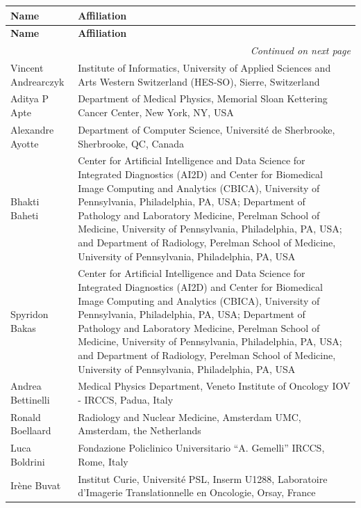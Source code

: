 \documentclass[fleqn,a4paper,oneside,openany]{book}
\begin{document}
\small
\begin{longtable}{p{4cm}p{10cm}}

\toprule
\textbf{Name} & \textbf{Affiliation} \\
\midrule
\endfirsthead

\toprule
\textbf{Name} & \textbf{Affiliation} \\
\midrule
\endhead

\bottomrule
\multicolumn{2}{r}{\textit{Continued on next page}}
\endfoot

\\
\endlastfoot
Vincent Andrearczyk & Institute of Informatics, University of Applied Sciences and Arts Western Switzerland (HES-SO), Sierre, Switzerland\\
Aditya P Apte & Department of Medical Physics, Memorial Sloan Kettering Cancer Center, New York, NY, USA\\
Alexandre Ayotte & Department of Computer Science, Université de Sherbrooke, Sherbrooke, QC, Canada\\
Bhakti Baheti & Center for Artificial Intelligence and Data Science for Integrated Diagnostics (AI2D) and Center for Biomedical Image Computing and Analytics (CBICA), University of Pennsylvania, Philadelphia, PA, USA; Department of Pathology and Laboratory Medicine, Perelman School of Medicine, University of Pennsylvania, Philadelphia, PA, USA; and Department of Radiology, Perelman School of Medicine, University of Pennsylvania, Philadelphia, PA, USA\\
Spyridon Bakas & Center for Artificial Intelligence and Data Science for Integrated Diagnostics (AI2D) and Center for Biomedical Image Computing and Analytics (CBICA), University of Pennsylvania, Philadelphia, PA, USA; Department of Pathology and Laboratory Medicine, Perelman School of Medicine, University of Pennsylvania, Philadelphia, PA, USA; and Department of Radiology, Perelman School of Medicine, University of Pennsylvania, Philadelphia, PA, USA\\
Andrea Bettinelli & Medical Physics Department, Veneto Institute of Oncology IOV - IRCCS, Padua, Italy\\
Ronald Boellaard & Radiology and Nuclear Medicine, Amsterdam UMC, Amsterdam, the Netherlands\\
Luca Boldrini & Fondazione Policlinico Universitario “A. Gemelli” IRCCS, Rome, Italy\\
Irène Buvat & Institut Curie, Université PSL, Inserm U1288, Laboratoire d’Imagerie Translationnelle en Oncologie, Orsay, France\\

\end{longtable}
\end{document}
